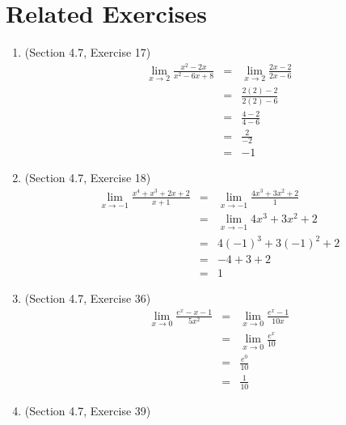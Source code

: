 \documentclass{article}
\begin{document}
\section*{Related Exercises}
\begin{enumerate}
    \item (Section 4.7, Exercise 17)
        \begin{eqnarray}
            \lim_{x \to 2}{\frac{x^2 - 2x}{x^2 - 6x + 8}} &=& \lim_{x \to 2}{\frac{2x - 2}{2x - 6}} \\
                                                          &=& \frac{2(2) - 2}{2(2) - 6} \\
                                                          &=& \frac{4 - 2}{4 - 6} \\
                                                          &=& \frac{2}{-2} \\
                                                          &=& -1
        \end{eqnarray}
    \item (Section 4.7, Exercise 18)
        \begin{eqnarray}
            \lim_{x \to -1}{\frac{x^4 + x^3 + 2x + 2}{x + 1}} &=& \lim_{x \to -1}{\frac{4x^3 + 3x^2 + 2}{1}} \\
                                                              &=& \lim_{x \to -1}{4x^3 + 3x^2 + 2} \\
                                                              &=& 4(-1)^3 + 3(-1)^2 + 2 \\
                                                              &=& -4 + 3 + 2 \\
                                                              &=& 1
        \end{eqnarray}
    \item (Section 4.7, Exercise 36)
        \begin{eqnarray}
            \lim_{x \to 0}{\frac{e^x - x - 1}{5x^2}} &=& \lim_{x \to 0}{\frac{e^x - 1}{10x}} \\
                                                     &=& \lim_{x \to 0}{\frac{e^x}{10}} \\
                                                     &=& \frac{e^0}{10} \\
                                                     &=& \frac{1}{10}
        \end{eqnarray}
    \item (Section 4.7, Exercise 39)
        \begin{eqnarray}

\end{eqnarray}
\end{enumerate}
\end{document}
